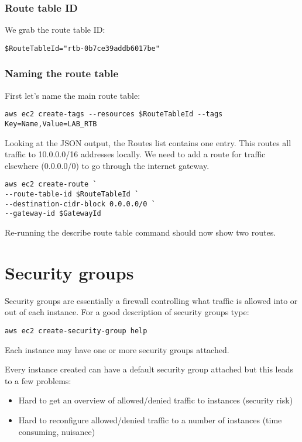 \documentclass{pgnotes}
\begin{document}
\subsubsection{Route table ID}

We grab the route table ID:
\begin{verbatim}
$RouteTableId="rtb-0b7ce39addb6017be"
\end{verbatim}

\subsubsection{Naming the route table}

First let's name the main route table:

\begin{verbatim}
aws ec2 create-tags --resources $RouteTableId --tags Key=Name,Value=LAB_RTB
\end{verbatim}

Looking at the JSON output, the Routes list contains one entry. This
routes all traffic to 10.0.0.0/16 addresses locally. We need to add a
route for traffic elsewhere (0.0.0.0/0) to go through the internet
gateway.

\begin{verbatim}
aws ec2 create-route `
--route-table-id $RouteTableId `
--destination-cidr-block 0.0.0.0/0 `
--gateway-id $GatewayId
\end{verbatim}

Re-running the describe route table command should now show two routes.

\section{Security groups}
\label{security-groups}

Security groups are essentially a firewall controlling what traffic is
allowed into or out of each instance. For a good description of security
groups type:

\begin{verbatim}
aws ec2 create-security-group help
\end{verbatim}

Each instance may have one or more security groups attached.

Every instance created can have a default security group attached but
this leads to a few problems:

\begin{itemize}
\item
  Hard to get an overview of allowed/denied traffic to instances
  (security risk)
\item
  Hard to reconfigure allowed/denied traffic to a number of instances
  (time consuming, nuisance)
\end{itemize}
\end{document}
